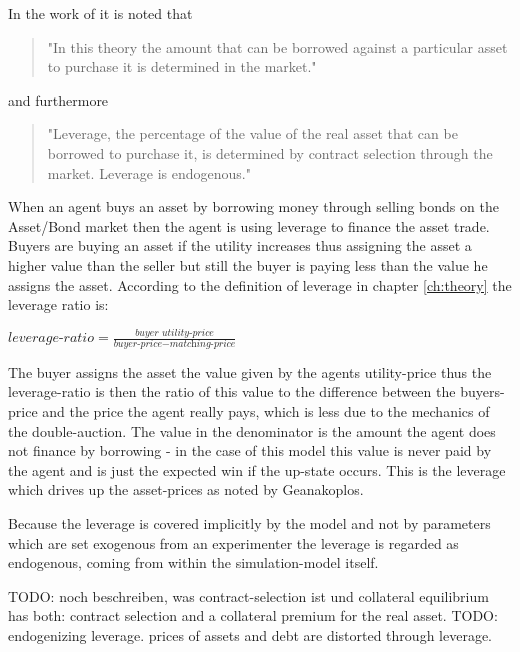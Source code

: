 \documentclass[../Bachelorarbeit.tex]{subfiles}
\begin{document}
\medskip
In the work of \cite{Breuer2015} it is noted that 
\begin{quote}
"In this theory the amount that can be borrowed against a particular asset to purchase it is determined in the market."
\end{quote}

and furthermore

\begin{quote}
"Leverage, the percentage of the value of the real asset that can be borrowed to purchase it, is determined by contract selection through the market. Leverage is endogenous."
\end{quote}

When an agent buys an asset by borrowing money through selling bonds on the Asset/Bond market then the agent is using leverage to finance the asset trade. Buyers are buying an asset if the utility increases thus assigning the asset a higher value than the seller but still the buyer is paying less than the value he assigns the asset. According to the definition of leverage in chapter \ref{ch:theory} the leverage ratio is:

\begin{center}
$\textit{leverage-ratio} = \frac{\textit{buyer utility-price}}{\textit{buyer-price} - \textit{matching-price}}$
\end{center}

The buyer assigns the asset the value given by the agents utility-price thus the leverage-ratio is then the ratio of this value to the difference between the buyers-price and the price the agent really pays, which is less due to the mechanics of the double-auction. The value in the denominator is the amount the agent does not finance by borrowing - in the case of this model this value is never paid by the agent and is just the expected win if the up-state occurs. This is the leverage which drives up the asset-prices as noted by Geanakoplos.

\medskip

Because the leverage is covered implicitly by the model and not by parameters which are set exogenous from an experimenter the leverage is regarded as endogenous, coming from within the simulation-model itself.

\medskip
TODO: noch beschreiben, was contract-selection ist und collateral equilibrium has both: contract selection and a collateral premium for the real asset.
TODO: endogenizing leverage. prices of assets and debt are distorted through leverage.
\end{document}
